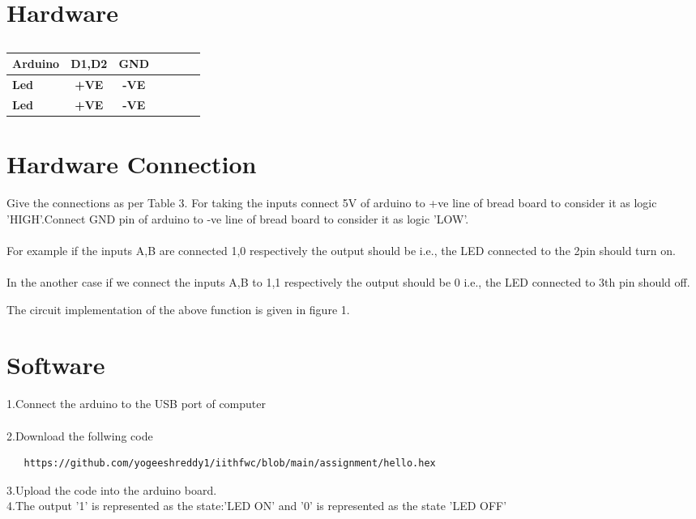 \documentclass[10pt, a4paper]{article}
\begin{document}
\begin{table}[htbp]


   
    \section{Hardware}
\begin{center}
    \begin{tabular}{|l|c|c|c|c|c|c|} \hline 
 \textbf{Arduino} & \textbf{D1,D2} & \textbf{GND} \\ \hline
 \textbf{Led} & \textbf{+VE} & \textbf{-VE}\\ \hline
 \textbf{Led} & \textbf{+VE} & \textbf{-VE}\\ \hline
\end{tabular}   
\end{center}
\caption{\label{table:dummytable}}
\end{table}
   
   \section{Hardware Connection}
   Give the connections as per Table 3. For taking the inputs connect 5V of arduino to +ve line of bread board to consider it as logic 'HIGH'.Connect GND pin of arduino to -ve line of bread board to consider it as logic 'LOW'.
\\
\\
For example if the inputs A,B are connected 1,0 respectively the output should be  i.e., the LED connected to the  2pin should turn on.
\\
\\
In the another case if we connect the inputs A,B to 1,1 respectively the output should be 0 i.e., the LED connected to 3th pin should off.

  The circuit implementation of the above function is given in figure 1.
\section{Software}
  1.Connect the arduino to the USB port of computer
  \\
  \\2.Download the follwing code
  \\
  \begin{lstlisting}
   https://github.com/yogeeshreddy1/iithfwc/blob/main/assignment/hello.hex
  \end{lstlisting}
  
  3.Upload the code into the arduino board.
  \\4.The output '1' is represented as the state:'LED ON' and '0' is represented as the state 'LED OFF'



   
   
 
\end{document}
